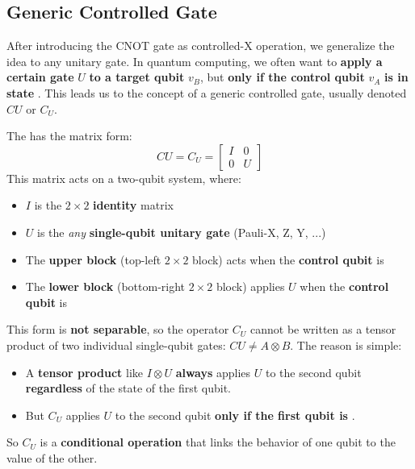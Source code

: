 \subsection{Generic Controlled Gate}

After introducing the CNOT gate as controlled-X operation, we generalize the idea to any unitary gate. In quantum computing, we often want to \textbf{apply a certain gate} $U$ \textbf{to a target qubit} $v_{B}$, but \textbf{only if the control qubit} $v_{A}$ \textbf{is in state} . This leads us to the concept of a generic controlled gate, usually denoted $CU$ or $C_{U}$.

\highspace
The  has the matrix form:
\begin{equation}
    CU = C_{U} = \begin{bmatrix}
        I & 0 \\
        0 & U
    \end{bmatrix}
\end{equation}
This matrix acts on a two-qubit system, where:
\begin{itemize}
    \item $I$ is the $2 \times 2$ \textbf{identity} matrix
    \item $U$ is the \emph{any} \textbf{single-qubit unitary gate} (Pauli-X, Z, Y, ...)
    \item The \textbf{upper block} (top-left $2 \times 2$ block) acts when the \textbf{control qubit} is 
    \item The \textbf{lower block} (bottom-right $2 \times 2$ block) applies $U$ when the \textbf{control qubit} is 
\end{itemize}
This form is \textbf{not separable}, so the operator $C_{U}$ cannot be written as a tensor product of two individual single-qubit gates: $CU \neq A \otimes B$. The reason is simple:
\begin{itemize}
    \item A \textbf{tensor product} like $I \otimes U$ \textbf{always} applies $U$ to the second qubit \textbf{regardless} of the state of the first qubit.
    \item But $C_{U}$ applies $U$ to the second qubit \textbf{only if the first qubit is} .
\end{itemize}
So $C_{U}$ is a \textbf{conditional operation} that links the behavior of one qubit to the value of the other.

